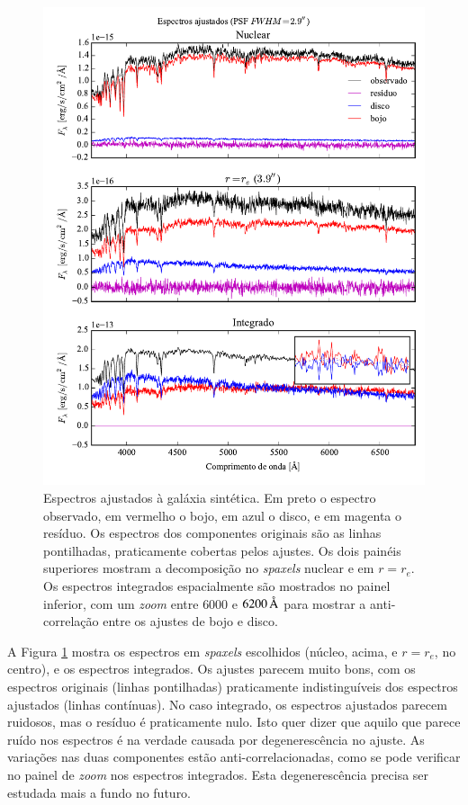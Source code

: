 \begin{figure}
	\includegraphics{figuras/simulation_spectra}
	\caption[Espectros ajustados à galáxia sintética]
	{Espectros ajustados à galáxia sintética. Em preto o espectro observado, em
	vermelho o bojo, em azul o disco, e em magenta o resíduo. Os
	espectros dos componentes originais são as linhas pontilhadas, praticamente
	cobertas pelos ajustes. Os dois painéis superiores mostram a decomposição no
	{\em spaxels} nuclear e em $r=r_e$. Os espectros integrados espacialmente são
	mostrados no painel inferior, com um {\em zoom} entre $6000$ e
	$6200\,\text{\normalfont\AA}$ para mostrar a anti-correlação entre os ajustes de bojo e
	disco.}
	\label{fig:testFitSpectra}
\end{figure}

A Figura \ref{fig:testFitSpectra} mostra os espectros em {\em spaxels}
escolhidos (núcleo, acima, e $r=r_e$, no centro), e os espectros integrados. Os
ajustes parecem muito bons, com os espectros originais (linhas pontilhadas)
praticamente indistinguíveis dos espectros ajustados (linhas contínuas). No caso
integrado, os espectros ajustados parecem ruidosos, mas o resíduo é praticamente
nulo. Isto quer dizer que aquilo que parece ruído nos espectros é na verdade
causada por degenerescência no ajuste. As variações nas duas componentes estão
anti-correlacionadas, como se pode verificar no painel de {\em zoom} nos
espectros integrados. Esta degenerescência precisa ser estudada mais a fundo no
futuro.

